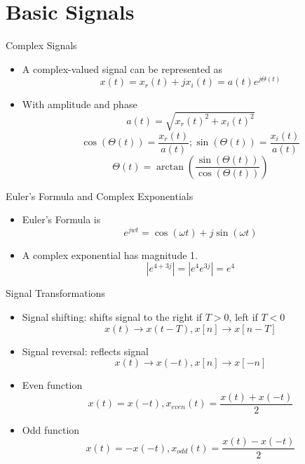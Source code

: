 \section{Basic Signals}

\begin{frame}{Complex Signals}

    \begin{itemize}
        \item A complex-valued signal can be represented as
            \[
                x(t) = x_r(t) + j x_i(t) = a(t)e^{j \Theta(t)}
            \]
        \item With amplitude and phase
            \[
                a(t) = \sqrt{{x_r(t)}^2 + {x_i(t)}^2}
            \]
            \[
               \cos(\Theta(t)) = \frac{x_r(t)}{a(t)}; \sin(\Theta(t)) = \frac{x_i(t)}{a(t)}
            \]
            \[
                \Theta(t) = \arctan(\frac{\sin(\Theta(t))}{\cos(\Theta(t))})
            \]
          \end{itemize}
\end{frame}

\begin{frame}{Euler's Formula and Complex Exponentials}
    \begin{itemize}
        \item Euler's Formula is
        \[e^{jwt} = \cos(\omega t) + j\sin(\omega t)\]
        \item A complex exponential has magnitude 1.
          \[ |e^{4 + 3j}| = |e^{4}e^{3j}| = e^4 \]
        \end{itemize}
\end{frame}

\begin{frame}{Signal Transformations}
\begin{itemize}
    \item Signal shifting: shifts signal to the right if $T > 0$, left if $T < 0$
    \[
        x(t) \rightarrow x(t - T), x[n] \rightarrow x[n - T]
    \]
    \item Signal reversal: reflects signal
    \[
        x(t) \rightarrow x(-t), x[n] \rightarrow x[-n]
    \]
    \item Even function
    \[ x(t)  = x(-t),
    x_{even}(t) = \frac{x(t) + x(-t)}{2} \]
    \item Odd function
    \[ x(t) = - x(-t),
    x_{odd}(t) = \frac{x(t) - x(-t)}{2} \]
\end{itemize}

\end{frame}

